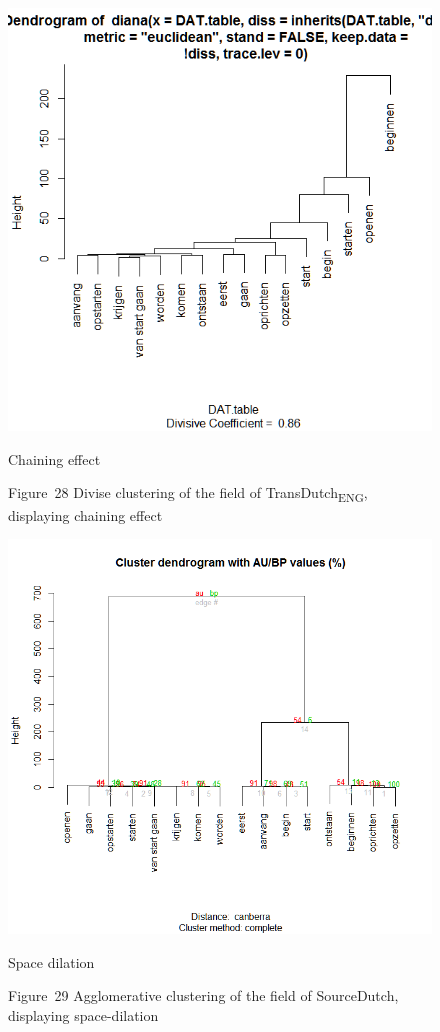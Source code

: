 \begin{figure}%
  

\includegraphics[height=.3\textheight]{figures/Vandevoorde2-img28.png}
 


Chaining effect\caption{
Figure~28  Divise clustering of the field of TransDutch\textsubscript{ENG}, displaying chaining effect}
\end{figure}

\begin{figure}%
  

\includegraphics[height=.3\textheight]{figures/Vandevoorde2-img29.png}
 


Space dilation\caption{
Figure~29  Agglomerative clustering of the field of SourceDutch, displaying space-dilation}
\end{figure}



